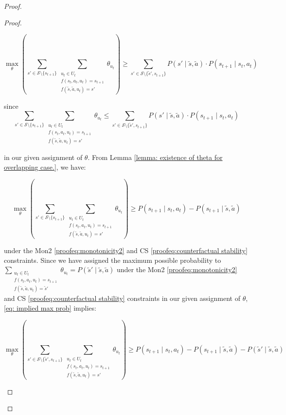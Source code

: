 \begin{proof}
\begin{proof}
\begin{itemize}
\begin{itemize}
        \[
        \max_{\theta} \left(\sum_{s' \in \mathcal{S}\setminus \{s_{t+1}\}}\sum_{\substack{u_t \in U_t\\f(s_t, a_t, u_t) = s_{t+1} \\ f(\tilde{s}, \tilde{a}, u_t) = s'}}{\theta_{u_t}}\right) \geq \sum_{s' \in \mathcal{S}\setminus\{\tilde{s}', s_{t+1}\}}P(s' \mid \tilde{s}, \tilde{a}) \cdot P(s_{t+1} \mid s_t, a_t)
        \]

        since 
        \[
        \sum_{s' \in \mathcal{S}\setminus \{s_{t+1}\}}\sum_{\substack{u_t \in U_t\\f(s_t, a_t, u_t) = s_{t+1} \\ f(\tilde{s}, \tilde{a}, u_t) = s'}}{\theta_{u_t}} \leq 
        \sum_{s' \in \mathcal{S}\setminus\{\tilde{s}', s_{t+1}\}}P(s' \mid \tilde{s}, \tilde{a}) \cdot P(s_{t+1} \mid s_t, a_t)
        \]
        
        in our given assignment of $\theta$. From Lemma \ref{lemma: existence of theta for overlapping case.}, we have:

        \begin{equation}
        \label{eq: implied max prob}
            \max_{\theta}\left(\sum_{s' \in \mathcal{S}\setminus \{s_{t+1}\}}\sum_{\substack{u_t \in U_t\\f(s_t, a_t, u_t) = s_{t+1} \\ f(\tilde{s}, \tilde{a}, u_t) = s'}}{\theta_{u_t}}\right) \geq P(s_{t+1} \mid s_t, a_t) - P(s_{t+1} \mid \tilde{s}, \tilde{a})
        \end{equation}

        under the Mon2 \eqref{proofeq:monotonicity2} and CS \eqref{proofeq:counterfactual stability} constraints. Since we have assigned the maximum possible probability to $\sum_{\substack{u_t \in U_t \\f(s_t, a_t, u_t) = s_{t+1} \\ f(\tilde{s}, \tilde{a}, u_t) = \tilde{s}'}}{\theta_{u_t}} = P(\tilde{s}' \mid \tilde{s}, \tilde{a})$ under the Mon2 \eqref{proofeq:monotonicity2} and CS \eqref{proofeq:counterfactual stability} constraints in our given assignment of $\theta$, \eqref{eq: implied max prob} implies:

        \[\max_{\theta}\left(\sum_{s' \in \mathcal{S}\setminus \{\tilde{s}', s_{t+1}\}}\sum_{\substack{u_t \in U_t\\f(s_t, a_t, u_t) = s_{t+1} \\ f(\tilde{s}, \tilde{a}, u_t) = s'}}{\theta_{u_t}}\right) \geq P(s_{t+1} \mid s_t, a_t) - P(s_{t+1} \mid \tilde{s}, \tilde{a}) -  P(\tilde{s}' \mid \tilde{s}, \tilde{a})\]


\end{itemize}
\end{itemize}
\end{proof}
\end{proof}
